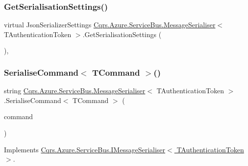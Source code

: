 \subsubsection{\texorpdfstring{Get\+Serialisation\+Settings()}{GetSerialisationSettings()}}
{\footnotesize\ttfamily virtual Json\+Serializer\+Settings \hyperlink{classCqrs_1_1Azure_1_1ServiceBus_1_1MessageSerialiser}{Cqrs.\+Azure.\+Service\+Bus.\+Message\+Serialiser}$<$ T\+Authentication\+Token $>$.Get\+Serialisation\+Settings (\begin{DoxyParamCaption}{ }\end{DoxyParamCaption})\hspace{0.3cm}{\ttfamily [protected]}, {\ttfamily [virtual]}}

\mbox{\label{classCqrs_1_1Azure_1_1ServiceBus_1_1MessageSerialiser_a50107f67d604c45136d9fa3d73400e3a_a50107f67d604c45136d9fa3d73400e3a}} 
\subsubsection{\texorpdfstring{Serialise\+Command$<$ T\+Command $>$()}{SerialiseCommand< TCommand >()}}
{\footnotesize\ttfamily string \hyperlink{classCqrs_1_1Azure_1_1ServiceBus_1_1MessageSerialiser}{Cqrs.\+Azure.\+Service\+Bus.\+Message\+Serialiser}$<$ T\+Authentication\+Token $>$.Serialise\+Command$<$ T\+Command $>$ (\begin{DoxyParamCaption}\item[{T\+Command}]{command }\end{DoxyParamCaption})}



Implements \hyperlink{interfaceCqrs_1_1Azure_1_1ServiceBus_1_1IMessageSerialiser_a7454ac36eca3dd37d0c596e0406b4c81_a7454ac36eca3dd37d0c596e0406b4c81}{Cqrs.\+Azure.\+Service\+Bus.\+I\+Message\+Serialiser$<$ T\+Authentication\+Token $>$}.

